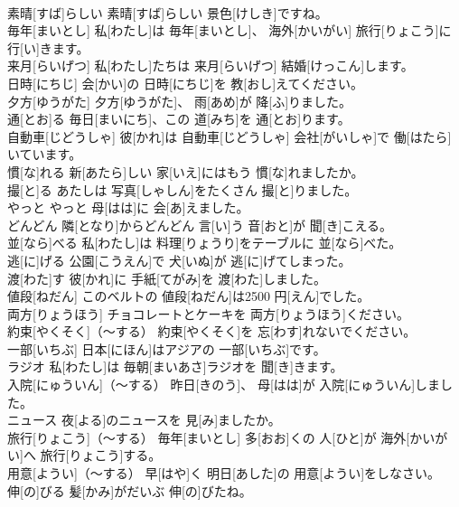 \documentclass[8pt]{extreport}
\begin{document}
\begin{CJK}{UTF8}{min}
\\	素晴[すば]らしい	素晴[すば]らしい 景色[けしき]ですね。		
\\	毎年[まいとし]	私[わたし]は 毎年[まいとし]、 海外[かいがい] 旅行[りょこう]に 行[い]きます。		
\\	来月[らいげつ]	私[わたし]たちは 来月[らいげつ] 結婚[けっこん]します。		
\\	日時[にちじ]	会[かい]の 日時[にちじ]を 教[おし]えてください。		
\\	夕方[ゆうがた]	夕方[ゆうがた]、 雨[あめ]が 降[ふ]りました。		
\\	通[とお]る	毎日[まいにち]、この 道[みち]を 通[とお]ります。		
\\	自動車[じどうしゃ]	彼[かれ]は 自動車[じどうしゃ] 会社[がいしゃ]で 働[はたら]いています。		
\\	慣[な]れる	新[あたら]しい 家[いえ]にはもう 慣[な]れましたか。		
\\	撮[と]る	あたしは 写真[しゃしん]をたくさん 撮[と]りました。		
\\	やっと	やっと 母[はは]に 会[あ]えました。		
\\	どんどん	隣[となり]からどんどん 言[い]う 音[おと]が 聞[き]こえる。		
\\	並[なら]べる	私[わたし]は 料理[りょうり]をテーブルに 並[なら]べた。		
\\	逃[に]げる	公園[こうえん]で 犬[いぬ]が 逃[に]げてしまった。		
\\	渡[わた]す	彼[かれ]に 手紙[てがみ]を 渡[わた]しました。		
\\	値段[ねだん]	このベルトの 値段[ねだん]は2500 円[えん]でした。		
\\	両方[りょうほう]	チョコレートとケーキを 両方[りょうほう]ください。		
\\	約束[やくそく]（～する）	約束[やくそく]を 忘[わす]れないでください。		
\\	一部[いちぶ]	日本[にほん]はアジアの 一部[いちぶ]です。		
\\	ラジオ	私[わたし]は 毎朝[まいあさ]ラジオを 聞[き]きます。		
\\	入院[にゅういん]（～する）	昨日[きのう]、 母[はは]が 入院[にゅういん]しました。		
\\	ニュース	夜[よる]のニュースを 見[み]ましたか。		
\\	旅行[りょこう]（～する）	毎年[まいとし] 多[おお]くの 人[ひと]が 海外[かいがい]へ 旅行[りょこう]する。		
\\	用意[ようい]（～する）	早[はや]く 明日[あした]の 用意[ようい]をしなさい。		
\\	伸[の]びる	髪[かみ]がだいぶ 伸[の]びたね。		

\end{CJK}
\end{document}
